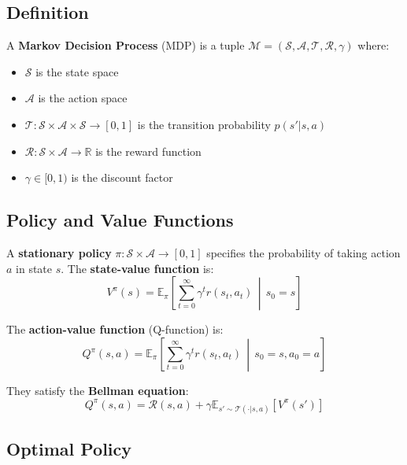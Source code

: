 \documentclass[11pt,a4paper]{report}
\begin{document}
\subsection{Definition}

A \textbf{Markov Decision Process} (MDP) is a tuple $\mathcal{M} = (\mathcal{S}, \mathcal{A}, \mathcal{T}, \mathcal{R}, \gamma)$ where:
\begin{itemize}
    \item $\mathcal{S}$ is the state space
    \item $\mathcal{A}$ is the action space
    \item $\mathcal{T}: \mathcal{S} \times \mathcal{A} \times \mathcal{S} \to [0,1]$ is the transition probability $p(s' | s, a)$
    \item $\mathcal{R}: \mathcal{S} \times \mathcal{A} \to \mathbb{R}$ is the reward function
    \item $\gamma \in [0,1)$ is the discount factor
\end{itemize}

\subsection{Policy and Value Functions}

A \textbf{stationary policy} $\pi: \mathcal{S} \times \mathcal{A} \to [0,1]$ specifies the probability of taking action $a$ in state $s$. The \textbf{state-value function} is:
\begin{equation}
    V^\pi(s) = \mathbb{E}_{\pi}\left[ \sum_{t=0}^{\infty} \gamma^t r(s_t, a_t) \,\middle|\, s_0 = s \right]
\end{equation}

The \textbf{action-value function} (Q-function) is:
\begin{equation}
    Q^\pi(s,a) = \mathbb{E}_{\pi}\left[ \sum_{t=0}^{\infty} \gamma^t r(s_t, a_t) \,\middle|\, s_0 = s, a_0 = a \right]
\end{equation}

They satisfy the \textbf{Bellman equation}:
\begin{equation}
    Q^\pi(s,a) = \mathcal{R}(s,a) + \gamma \mathbb{E}_{s' \sim \mathcal{T}(\cdot|s,a)}\left[ V^\pi(s') \right]
\end{equation}

\subsection{Optimal Policy}
\end{document}
